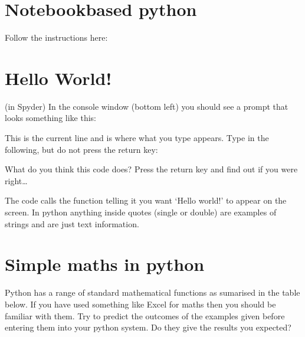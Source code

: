 \documentclass[letterpaper,10pt,english]{jupyterBook}
\begin{document}
\section{Notebook\sphinxhyphen{}based python}
\label{\detokenize{GettingStarted:notebook-based-python}}
\sphinxAtStartPar
Follow the instructions here: 


\section{Hello World!}
\label{\detokenize{GettingStarted:hello-world}}
\sphinxAtStartPar
(in Spyder) In the console window (bottom left) you should see a prompt that looks something like this:

\begin{sphinxVerbatim}[commandchars=\\\{\}]
\PYG{p}{[}\PYG{p}{]}
\end{sphinxVerbatim}

\sphinxAtStartPar
This is the current line and is where what you type appears. Type in the following, but do not press the return key:

\begin{sphinxVerbatim}[commandchars=\\\{\}]
\end{sphinxVerbatim}

\sphinxAtStartPar
What do you think this code does? Press the return key and find out if you were right…

\sphinxAtStartPar
The code calls the  function telling it you want ‘Hello world!’ to appear on the screen. In python anything inside quotes (single or double) are examples of strings and are just text information.


\section{Simple maths in python}
\label{\detokenize{GettingStarted:simple-maths-in-python}}
\sphinxAtStartPar
Python has a range of standard mathematical functions as sumarised in the table below. If you have used something like Excel for maths then you should be familiar with them. Try to predict the outcomes of the examples given before entering them into your python system. Do they give the results you expected?
\end{document}
